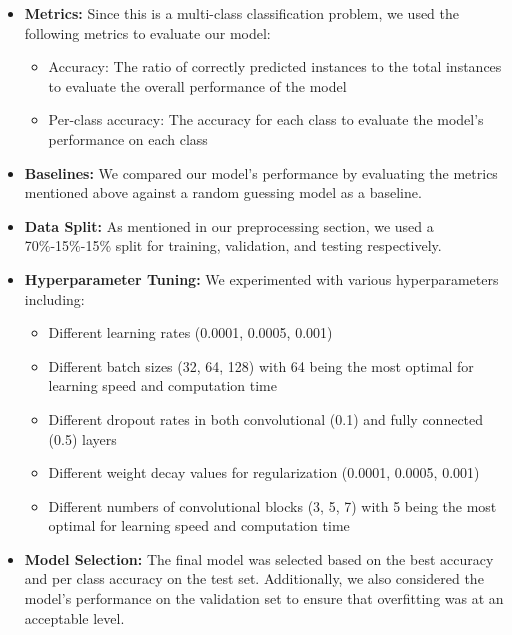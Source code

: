 \documentclass[10pt]{article}
\begin{document}
\begin{itemize}
    \item \textbf{Metrics:} Since this is a multi-class classification problem, we used the following metrics to evaluate our model:
    \begin{itemize}
        \item Accuracy: The ratio of correctly predicted instances to the total instances to evaluate the overall performance of the model
        \item Per-class accuracy: The accuracy for each class to evaluate the model's performance on each class
    \end{itemize}

    \item \textbf{Baselines:} We compared our model's performance by evaluating the metrics mentioned above against a random guessing model as a baseline.

    \item \textbf{Data Split:} As mentioned in our preprocessing section, we used a 70\%-15\%-15\% split for training, validation, and testing respectively.
    
    \item \textbf{Hyperparameter Tuning:} We experimented with various hyperparameters including:
    \begin{itemize}
        \item Different learning rates (0.0001, 0.0005, 0.001)
        \item Different batch sizes (32, 64, 128) with 64 being the most optimal for learning speed and computation time
        \item Different dropout rates in both convolutional (0.1) and fully connected (0.5) layers
        \item Different weight decay values for regularization (0.0001, 0.0005, 0.001)
        \item Different numbers of convolutional blocks (3, 5, 7) with 5 being the most optimal for learning speed and computation time
    \end{itemize}
    
    \item \textbf{Model Selection:} The final model was selected based on the best accuracy and per class accuracy on the test set. Additionally, we also considered the model's performance on the 
    validation set to ensure that overfitting was at an acceptable level.
\end{itemize}
\end{document}
